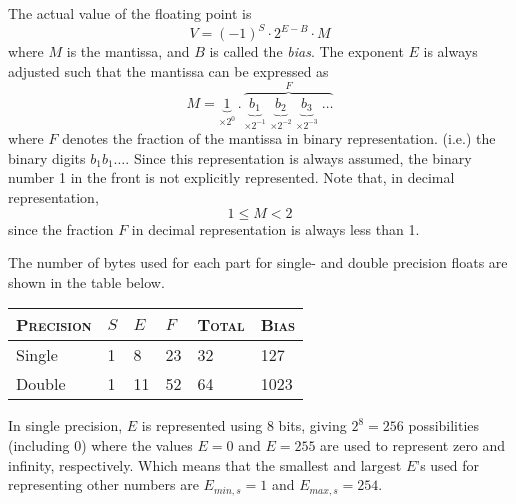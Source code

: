 The actual value of the floating point is
\begin{equation}
  V = (-1)^S \cdot 2^{E-B} \cdot M \label{eq:float_value}
\end{equation}
where $M$ is the mantissa, and $B$ is called the \emph{bias}. The exponent $E$ is always adjusted such that the mantissa can be expressed as
\begin{equation}
  M = \underset{\times 2^0}{\underbrace{1}} \, . \,
                                              \overset{F}{
                                                \overbrace{
                                                  \underset{\times 2^{-1}}{\underbrace{b_1}} \;
                                                  \underset{\times 2^{-2}}{\underbrace{b_2}} \;
                                                  \underset{\times 2^{-3}}{\underbrace{b_3}} \;
                                                  \dots
                                                }
                                              }
\end{equation}
where $F$ denotes the fraction of the mantissa in binary representation. (i.e.) the binary digits $b_1b_1\dots$. Since this representation is always assumed, the binary number 1 in the front is not explicitly represented. Note that, in decimal representation,
\begin{equation}
  1 \leq M < 2
\end{equation}
since the fraction $F$ in decimal representation is always less than 1.

The number of bytes used for each part for single- and double precision floats are shown in the table below.

\vspace*{1em}
\begin{center}
    \begin{tabular}{lllll|l}
      \toprule
      \textsc{Precision} & $S$ & $E$ & $F$ & \textsc{Total} & \textsc{Bias} \\
      \midrule
      Single & 1 & 8  & 23 & 32 & 127 \\
      Double & 1 & 11 & 52 & 64 & 1023 \\
      \bottomrule
  \end{tabular}
\end{center}

In single precision, $E$ is represented using 8 bits, giving $2^8 = 256$ possibilities (including 0) where the values $E=0$ and $E=255$ are used to represent zero and infinity, respectively. Which means that the smallest and largest $E$'s used for representing other numbers are $E_{min,s}=1$ and $E_{max,s}=254$.

